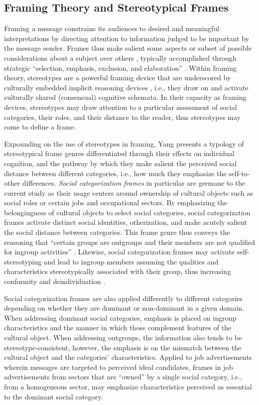 \documentclass[Royal,sageapa,times]{sagej}
\begin{document}
\subsection{Framing Theory and Stereotypical Frames\label{framing_theory_and_stereotypical_frames}}
Framing a message constrains its audiences to desired and meaningful interpretations by directing attention to information judged to be important by the message sender. Frames thus make salient some aspects or subset of possible considerations about a subject over others , typically accomplished through strategic “selection, emphasis, exclusion, and elaboration” . Within framing theory, stereotypes are a powerful framing device that are underscored by culturally embedded implicit reasoning devices \cite{VanGorp2009}, i.e., they draw on and activate culturally shared (consensual) cognitive schemata. In their capacity as framing devices, stereotypes may draw attention to a particular assessment of social categories, their roles, and their distance to the reader, thus stereotypes may come to define a frame.

Expounding on the use of stereotypes in framing, Yang \citeyear{Yang2015a} presents a typology of stereotypical frame genres differentiated through their effects on individual cognition, and the pathway by which they make salient the perceived social distance between different categories, i.e., how much they emphasize the self-to-other differences. \emph{Social categorization frames} in particular are germane to the current study as their usage centers around ownership of cultural objects such as social roles or certain jobs and occupational sectors. By emphasizing the belongingness of cultural objects to select social categories, social categorization frames activate distinct social identities, otherization, and make acutely salient the social distance between categories. This frame genre thus conveys the reasoning that “certain groups are outgroups and their members are not qualified for ingroup activities” . Likewise, social categorization frames may activate self-stereotyping and lead to ingroup members assuming the qualities and characteristics stereotypically associated with their group, thus increasing conformity and deindividuation .

Social categorization frames are also applied differently to different categories depending on whether they are dominant or non-dominant in a given domain. When addressing dominant social categories, emphasis is placed on ingroup characteristics and the manner in which those complement features of the cultural object. When addressing outgroups, the information also tends to be stereotype-consistent, however, the emphasis is on the mismatch between the cultural object and the categories’ characteristics. Applied to job advertisements wherein messages are targeted to perceived ideal candidates, frames in job advertisements from sectors that are “owned” by a single social category, i.e., from a homogeneous sector, may emphasize characteristics perceived as essential to the dominant social category.
\end{document}
